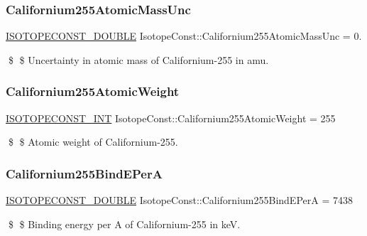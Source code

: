 \subsubsection{\texorpdfstring{Californium255\+Atomic\+Mass\+Unc}{Californium255AtomicMassUnc}}
{\footnotesize\ttfamily \mbox{\hyperlink{group___isotope_const-_macros_ga8f45a7272ce02c0b4c65c44636ed719a}{I\+S\+O\+T\+O\+P\+E\+C\+O\+N\+S\+T\+\_\+\+D\+O\+U\+B\+LE}} Isotope\+Const\+::\+Californium255\+Atomic\+Mass\+Unc = 0.}

\$ \$ Uncertainty in atomic mass of Californium-\/255 in amu. \mbox{\label{group___isotope_const-_californium-_cf255_ga469e6476ea45f69e145a4f1d26734b24}} 
\subsubsection{\texorpdfstring{Californium255\+Atomic\+Weight}{Californium255AtomicWeight}}
{\footnotesize\ttfamily \mbox{\hyperlink{group___isotope_const-_macros_ga5f18360b3e99483a35c32d789e62621c}{I\+S\+O\+T\+O\+P\+E\+C\+O\+N\+S\+T\+\_\+\+I\+NT}} Isotope\+Const\+::\+Californium255\+Atomic\+Weight = 255}

\$ \$ Atomic weight of Californium-\/255. \mbox{\label{group___isotope_const-_californium-_cf255_ga711d651d305e3dc131c4ba72d484ffb8}} 
\subsubsection{\texorpdfstring{Californium255\+Bind\+E\+PerA}{Californium255BindEPerA}}
{\footnotesize\ttfamily \mbox{\hyperlink{group___isotope_const-_macros_ga8f45a7272ce02c0b4c65c44636ed719a}{I\+S\+O\+T\+O\+P\+E\+C\+O\+N\+S\+T\+\_\+\+D\+O\+U\+B\+LE}} Isotope\+Const\+::\+Californium255\+Bind\+E\+PerA = 7438}

\$ \$ Binding energy per A of Californium-\/255 in keV. \mbox{\label{group___isotope_const-_californium-_cf255_ga50244f06d53e604d01fa1411b2f52807}} 
